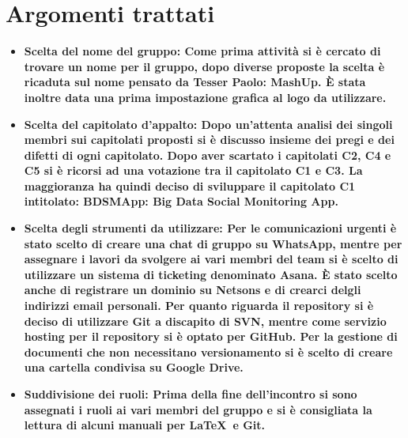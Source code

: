 %

\section{Argomenti trattati}
\begin{itemize}
  \item \bfseries{Scelta del nome del gruppo:} \textnormal{Come prima attività si è cercato di trovare un nome per il gruppo, dopo diverse proposte la scelta è ricaduta sul nome pensato da Tesser Paolo: \bfseries{MashUp}\textnormal{. È stata inoltre data una prima impostazione grafica al logo da utilizzare.}}
  \item \bfseries{Scelta del capitolato d'appalto:} \textnormal{Dopo un'attenta analisi dei singoli membri sui capitolati proposti si è discusso  insieme dei pregi e dei difetti di ogni capitolato. Dopo aver scartato i capitolati C2, C4 e C5 si è ricorsi ad una votazione tra il capitolato C1 e C3. La maggioranza ha quindi deciso di sviluppare il capitolato \bfseries{C1} \textnormal{intitolato:} \bfseries{BDSMApp: Big Data Social Monitoring App\textnormal{.}}}
  \item \bfseries{Scelta degli strumenti da utilizzare:} \textnormal{Per le comunicazioni urgenti è stato scelto di creare una chat di gruppo su WhatsApp, mentre per assegnare i lavori da svolgere ai vari membri del team si è scelto di utilizzare un sistema di ticketing denominato Asana.
  È stato scelto anche di registrare un dominio su Netsons e di crearci delgli indirizzi email personali.
  Per quanto riguarda il repository si è deciso di utilizzare Git a discapito di SVN, mentre come servizio hosting per il repository si è optato per GitHub. Per la gestione di documenti che non necessitano versionamento si è scelto di creare una cartella condivisa su Google Drive.}
  \item \bfseries{Suddivisione dei ruoli:} \textnormal{Prima della fine dell'incontro si sono assegnati i ruoli ai vari membri del gruppo e si è consigliata la lettura di alcuni manuali per \LaTeX\ e Git.}
\end{itemize}